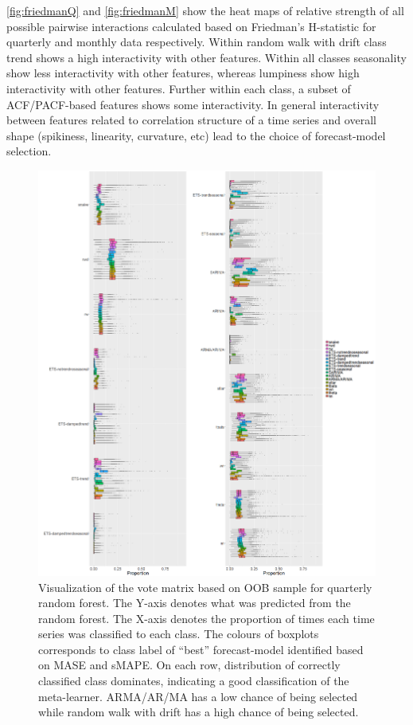 \documentclass[11pt,a4paper,]{article}
\begin{document}
\autoref{fig:friedmanQ} and \autoref{fig:friedmanM} show the heat maps
of relative strength of all possible pairwise interactions calculated
based on Friedman's H-statistic for quarterly and monthly data
respectively. Within random walk with drift class trend shows a high
interactivity with other features. Within all classes seasonality show
less interactivity with other features, whereas lumpiness show high
interactivity with other features. Further within each class, a subset
of ACF/PACF-based features shows some interactivity. In general
interactivity between features related to correlation structure of a
time series and overall shape (spikiness, linearity, curvature, etc)
lead to the choice of forecast-model selection.

\begin{figure}
\centering
\includegraphics{figures/oobquarterlymonthly1-1.png}
\caption{\label{fig:oobquarterlymonthly1}Visualization of the vote matrix
based on OOB sample for quarterly random forest. The Y-axis denotes what
was predicted from the random forest. The X-axis denotes the proportion
of times each time series was classified to each class. The colours of
boxplots corresponds to class label of ``best'' forecast-model
identified based on MASE and sMAPE. On each row, distribution of
correctly classified class dominates, indicating a good classification
of the meta-learner. ARMA/AR/MA has a low chance of being selected while
random walk with drift has a high chance of being selected.}
\end{figure}
\end{document}
